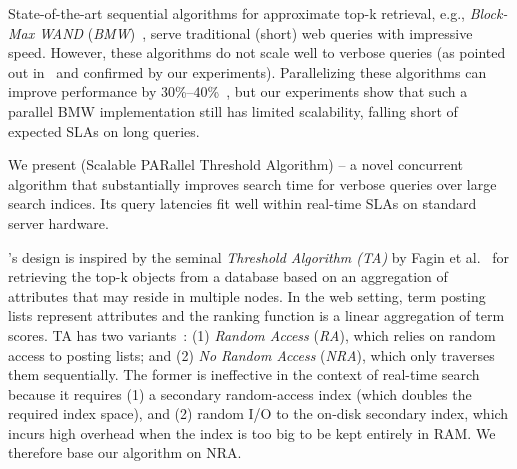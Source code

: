 State-of-the-art sequential algorithms for approximate top-k  retrieval, 
e.g., \emph{Block-Max WAND} ({\em BMW})~\cite{Ding:2011}, serve traditional (short) web queries with impressive speed. 
However, these algorithms do not scale well to verbose queries
(as pointed out in~\cite{Bortnikov:2017} and confirmed by our experiments). 
%
Parallelizing these algorithms can improve performance by 30\%--40\%~\cite{rojas2013efficient},    but 
our experiments show that such a parallel BMW implementation still has limited scalability, falling short of expected SLAs on long queries. 

We present \emph{\alg} (Scalable PARallel Threshold Algorithm) -- a novel 
concurrent algorithm that substantially improves search time for verbose queries over large search indices. Its
 query latencies fit well within  real-time SLAs on standard  server hardware. 

\alg's design is inspired by the seminal \emph{Threshold Algorithm (TA)} by Fagin et al.~\cite{Fagin:2003} for retrieving the top-k objects from a database based on an aggregation of attributes that may reside in multiple nodes. 
In the web setting, term posting lists represent attributes and the ranking function is a linear aggregation of term scores. TA has two variants~\cite{Fagin:2003}: (1) \emph{Random Access} ({\em RA}), which  
 relies on random access to  posting lists; 
and (2) \emph{No Random Access} ({\em NRA}), which 
 only traverses them sequentially. The former is ineffective in the context of real-time search 
because it requires (1)  a secondary random-access index (which doubles the required index space), 
and (2) random I/O to the on-disk secondary index, which incurs high overhead when the index  is too big to be 
kept entirely in RAM. We therefore base our algorithm on  NRA. 



